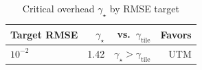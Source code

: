 \begin{table}[t]
\centering
\caption{Critical overhead $\gamma_\star$ by RMSE target}
\label{tab:gamma_star}
\footnotesize
\setlength{\tabcolsep}{3pt}
\begin{tabular}{lrrr}
\toprule
Target RMSE & $\gamma_\star$ & vs.\ $\gamma_{\mathrm{tile}}$ & Favors \\
\midrule
$10^{-2}$ & 1.42 & $\gamma_\star > \gamma_{\mathrm{tile}}$ & UTM \\
\bottomrule
\end{tabular}
\end{table}

